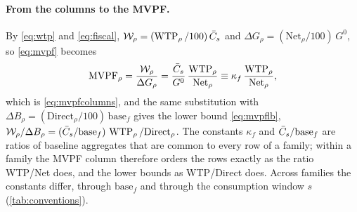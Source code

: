 \paragraph{From the columns to the MVPF.}
By \eqref{eq:wtp} and \eqref{eq:fiscal}, $\mathcal{W}_{\rho}=(\operatorname{WTP}_{\rho}/100)\,\bar{C}_{s}$ and $\Delta G_{\rho}=(\text{Net}_{\rho}/100)\,G^{0}$, so \eqref{eq:mvpf} becomes
\begin{equation}\label{eq:app-mvpfcol}
\operatorname{MVPF}_{\rho}=\frac{\mathcal{W}_{\rho}}{\Delta G_{\rho}}=\frac{\bar{C}_{s}}{G^{0}}\,\frac{\operatorname{WTP}_{\rho}}{\text{Net}_{\rho}}\equiv\kappa_f\,\frac{\operatorname{WTP}_{\rho}}{\text{Net}_{\rho}},
\end{equation}
which is \eqref{eq:mvpfcolumns}, and the same substitution with $\Delta B_{\rho}=(\text{Direct}_{\rho}/100)\,\text{base}_f$ gives the lower bound \eqref{eq:mvpflb}, $\mathcal{W}_{\rho}/\Delta B_{\rho}=(\bar{C}_{s}/\text{base}_f)\,\operatorname{WTP}_{\rho}/\text{Direct}_{\rho}$. The constants $\kappa_f$ and $\bar{C}_{s}/\text{base}_f$ are ratios of baseline aggregates that are common to every row of a family; within a family the MVPF column therefore orders the rows exactly as the ratio WTP/Net does, and the lower bounds as WTP/Direct does. Across families the constants differ, through $\text{base}_f$ and through the consumption window $s$ (\autoref{tab:conventions}).


